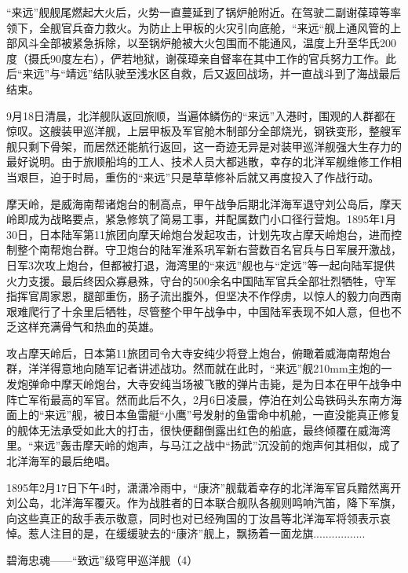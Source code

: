 \documentclass[12pt,UTF8]{ctexbook}
\begin{document}
“来远”舰舰尾燃起大火后，火势一直蔓延到了锅炉舱附近。在驾驶二副谢葆璋等率领下，全舰官兵奋力救火。为防止上甲板的火灾引向底舱，“来远“舰上通风管的上部风斗全部被紧急拆除，以至锅炉舱被大火包围而不能通风，温度上升至华氏200度（摄氏90度左右），俨若地狱，谢葆璋亲自督率在其中工作的官兵努力工作。此后“来远”与“靖远”结队驶至浅水区自救，后又返回战场，并一直战斗到了海战最后结束。

9月18日清晨，北洋舰队返回旅顺，当遍体鳞伤的“来远”入港时，围观的人群都在惊叹。这艘装甲巡洋舰，上层甲板及军官舱木制部分全部烧光，钢铁变形，整艘军舰只剩下骨架，而居然还能航行返回，这一奇迹无异是对装甲巡洋舰强大生存力的最好说明。由于旅顺船坞的工人、技术人员大都逃散，幸存的北洋军舰维修工作相当艰巨，迫于时局，重伤的“来远”只是草草修补后就又再度投入了作战行动。

摩天岭，是威海南帮诸炮台的制高点，甲午战争后期北洋海军退守刘公岛后，摩天岭即成为战略要点，紧急修筑了简易工事，并配属数门小口径行营炮。1895年1月30日，日本陆军第11旅团向摩天岭炮台发起攻击，计划先攻占摩天岭炮台，进而控制整个南帮炮台群。守卫炮台的陆军淮系巩军新右营数百名官兵与日军展开激战，日军3次攻上炮台，但都被打退，海湾里的“来远”舰也与“定远”等一起向陆军提供火力支援。最后终因众寡悬殊，守台的500余名中国陆军官兵全部壮烈牺牲，守军指挥官周家恩，腿部重伤，肠子流出腹外，但坚决不作俘虏，以惊人的毅力向西南艰难爬行了十余里后牺牲，尽管整个甲午战争中，中国陆军表现不如人意，但也不乏这样充满骨气和热血的英雄。

攻占摩天岭后，日本第11旅团司令大寺安纯少将登上炮台，俯瞰着威海南帮炮台群，洋洋得意地向随军记者讲述战功。然而就在此时，“来远”舰210mm主炮的一发炮弹命中摩天岭炮台，大寺安纯当场被飞散的弹片击毙，是为日本在甲午战争中阵亡军衔最高的军官。然而此后不久，2月6日凌晨，停泊在刘公岛铁码头东南方海面上的“来远”舰，被日本鱼雷艇“小鹰”号发射的鱼雷命中机舱，一直没能真正修复的舰体无法承受如此大的打击，很快便翻倒露出红色的船底，最终倾覆在威海湾里。“来远”轰击摩天岭的炮声，与马江之战中“扬武”沉没前的炮声何其相似，成了北洋海军的最后绝唱。

1895年2月17日下午4时，潇潇冷雨中，“康济”舰载着幸存的北洋海军官兵黯然离开刘公岛，北洋海军覆灭。作为战胜者的日本联合舰队各舰则鸣响汽笛，降下军旗，向这些真正的敌手表示敬意，同时也对已经殉国的丁汝昌等北洋海军将领表示哀悼。惹人注目的是，在缓缓驶去的“康济”舰上，飘扬着一面龙旗.................







碧海忠魂——“致远”级穹甲巡洋舰（4）
\end{document}
